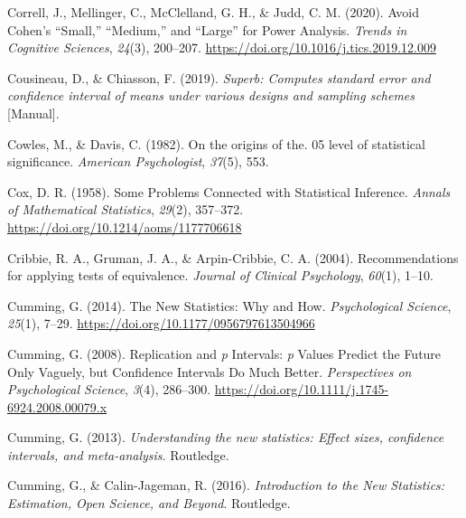 \documentclass[
  oneside]{krantz}
\newlength{\cslhangindent}
\newlength{\cslentryspacingunit} %
\newenvironment{CSLReferences}[2] %
 {%
  \setlength{\parindent}{0pt}
  \ifodd #1
  \let\oldpar\par
  \def\par{\hangindent=\cslhangindent\oldpar}
  \fi
  \setlength{\parskip}{#2\cslentryspacingunit}
 }%
 {}
\begin{document}
\begin{CSLReferences}{1}{0}
\leavevmode{}%
Correll, J., Mellinger, C., McClelland, G. H., \& Judd, C. M. (2020).
Avoid {Cohen}'s {``{Small},''} {``{Medium},''} and {``{Large}''} for
{Power Analysis}. \emph{Trends in Cognitive Sciences}, \emph{24}(3),
200--207. \url{https://doi.org/10.1016/j.tics.2019.12.009}

\leavevmode{}%
Cousineau, D., \& Chiasson, F. (2019). \emph{Superb: {Computes} standard
error and confidence interval of means under various designs and
sampling schemes} {[}Manual{]}.

\leavevmode{}%
Cowles, M., \& Davis, C. (1982). On the origins of the. 05 level of
statistical significance. \emph{American Psychologist}, \emph{37}(5),
553.

\leavevmode{}%
Cox, D. R. (1958). Some {Problems Connected} with {Statistical
Inference}. \emph{Annals of Mathematical Statistics}, \emph{29}(2),
357--372. \url{https://doi.org/10.1214/aoms/1177706618}

\leavevmode{}%
Cribbie, R. A., Gruman, J. A., \& Arpin-Cribbie, C. A. (2004).
Recommendations for applying tests of equivalence. \emph{Journal of
Clinical Psychology}, \emph{60}(1), 1--10.

\leavevmode{}%
Cumming, G. (2014). The {New Statistics}: {Why} and {How}.
\emph{Psychological Science}, \emph{25}(1), 7--29.
\url{https://doi.org/10.1177/0956797613504966}

\leavevmode{}%
Cumming, G. (2008). Replication and {\emph{p}} {Intervals}: {\emph{p}}
{Values Predict} the {Future Only Vaguely}, but {Confidence Intervals Do
Much Better}. \emph{Perspectives on Psychological Science}, \emph{3}(4),
286--300. \url{https://doi.org/10.1111/j.1745-6924.2008.00079.x}

\leavevmode{}%
Cumming, G. (2013). \emph{Understanding the new statistics: {Effect}
sizes, confidence intervals, and meta-analysis}. {Routledge}.

\leavevmode{}%
Cumming, G., \& Calin-Jageman, R. (2016). \emph{Introduction to the {New
Statistics}: {Estimation}, {Open Science}, and {Beyond}}. {Routledge}.


\end{CSLReferences}
\end{document}
